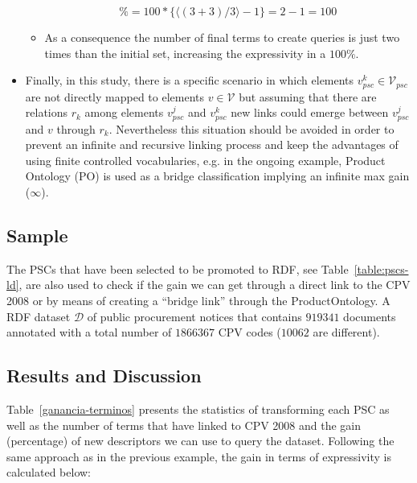 \begin{itemize}
\begin{itemize}
  \begin{equation}
      \% = 100 * \{ \langle (3+3) / 3 \rangle -1 \} = 2-1 = 100 
  \end{equation}
      \item As a consequence the number of final terms to create queries is just two times than the initial set, increasing the expressivity in a $100\%$.
  \end{itemize}

 \item Finally, in this study, there is a specific scenario in which elements $v^k_{psc} \in \mathcal{V}_{psc}$ are not directly mapped to elements $v \in \mathcal{V}$ but 
 assuming that there are relations $r_k$  among elements $v^j_{psc}$  and $v^k_{psc}$ new links could emerge between $v^j_{psc}$ and $v$ through $r_k$. Nevertheless this 
 situation should be avoided in order to prevent an infinite and recursive linking process and keep the advantages of using finite controlled vocabularies, 
 e.g. in the ongoing example, Product Ontology (PO) is used as a bridge classification implying an infinite max gain ($\infty$).
 
\end{itemize}

\subsection{Sample}

The PSCs that have been selected to be promoted to RDF, see Table~\ref{table:pscs-ld}, are also used to check 
if the gain we can get through a direct link to the CPV 2008 or by means of creating a ``bridge link'' 
through the ProductOntology. A RDF dataset $\mathcal{D}$ of public procurement notices that contains $919341$ documents 
annotated with a total number of $1866367$ CPV codes ($10062$ are different).


\subsection{Results and Discussion}
Table~\ref{ganancia-terminos} presents the statistics of transforming each PSC as well as the number of terms that have linked to CPV 2008 and the gain (percentage) of 
new descriptors we can use to query the dataset. Following the same approach as in the previous example, the gain in terms 
of expressivity is calculated below:


